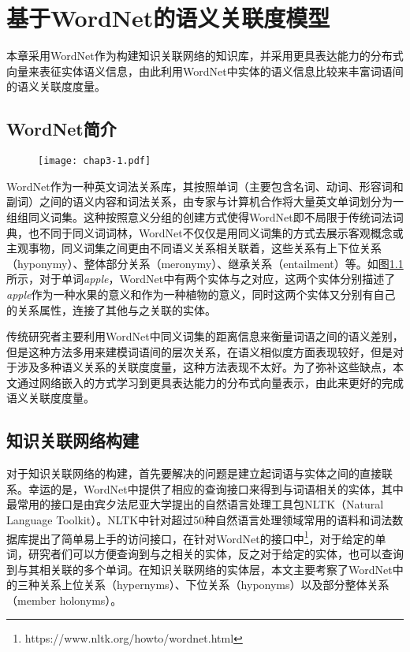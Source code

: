 \chapter{基于WordNet的语义关联度模型}
\label{chap:chap03}
本章采用WordNet作为构建知识关联网络的知识库，并采用更具表达能力的分布式向量来表征实体语义信息，由此利用WordNet中实体的语义信息比较来丰富词语间的语义关联度度量。

\section{WordNet简介}
\begin{figure}[!ht]
    \centerline{\texttt{[image: chap3-1.pdf]}}
    \label{chap3-1}
\end{figure}

WordNet作为一种英文词法关系库，其按照单词（主要包含名词、动词、形容词和副词）之间的语义内容和词法关系，由专家与计算机合作将大量英文单词划分为一组组同义词集。这种按照意义分组的创建方式使得WordNet即不局限于传统词法词典，也不同于同义词词林，WordNet不仅仅是用同义词集的方式去展示客观概念或主观事物，同义词集之间更由不同语义关系相关联着，这些关系有上下位关系（hyponymy）、整体部分关系（meronymy）、继承关系（entailment）等。如图\ref{chap3-1}所示，对于单词\emph{apple}，WordNet中有两个实体与之对应，这两个实体分别描述了\emph{apple}作为一种水果的意义和作为一种植物的意义，同时这两个实体又分别有自己的关系属性，连接了其他与之关联的实体。

传统研究者\cite{its/Rada89, Leacock98, wu1994verb, tkde/LiBM03}主要利用WordNet中同义词集的距离信息来衡量词语之间的语义差别，但是这种方法多用来建模词语间的层次关系，在语义相似度方面表现较好，但是对于涉及多种语义关系的关联度度量，这种方法表现不太好。为了弥补这些缺点，本文通过网络嵌入的方式学习到更具表达能力的分布式向量表示，由此来更好的完成语义关联度度量。

\section{知识关联网络构建}
对于知识关联网络的构建，首先要解决的问题是建立起词语与实体之间的直接联系。幸运的是，WordNet中提供了相应的查询接口来得到与词语相关的实体，其中最常用的接口是由宾夕法尼亚大学提出的自然语言处理工具包NLTK（Natural Language Toolkit）\cite{OM/Bird09}。NLTK中针对超过50种自然语言处理领域常用的语料和词法数据库提出了简单易上手的访问接口，在针对WordNet的接口中\footnote{https://www.nltk.org/howto/wordnet.html}，对于给定的单词，研究者们可以方便查询到与之相关的实体，反之对于给定的实体，也可以查询到与其相关联的多个单词。在知识关联网络的实体层，本文主要考察了WordNet中的三种关系上位关系（hypernyms）、下位关系（hyponyms）以及部分整体关系（member holonyms）。


